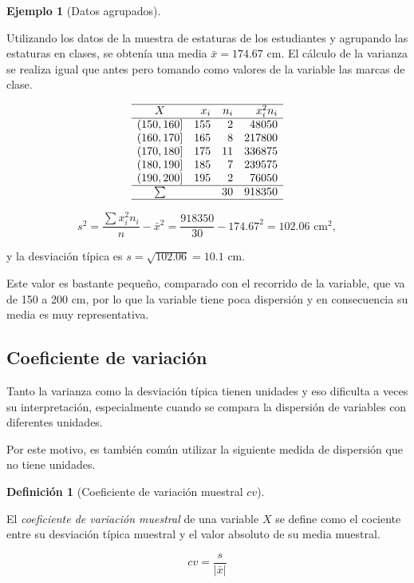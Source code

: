 \documentclass[
  spanish,
  a4paper,
]{scrreport}
\theoremstyle{plain}
\theoremstyle{definition}
\newtheorem{example}{Ejemplo}[chapter]
\theoremstyle{definition}
\newtheorem{definition}{Definición}[chapter]
\theoremstyle{remark}
\begin{document}
\begin{example}[Datos
agrupados]\protect\hypertarget{exm-desviacion-tipica-datos-agrupados}{}\label{exm-desviacion-tipica-datos-agrupados}

Utilizando los datos de la muestra de estaturas de los estudiantes y
agrupando las estaturas en clases, se obtenía una media
\(\bar x = 174.67\) cm. El cálculo de la varianza se realiza igual que
antes pero tomando como valores de la variable las marcas de clase.

\[
\begin{array}{crrr}
\hline
X & x_i & n_i & x_i^2n_i \\
\hline
(150,160] & 155 & 2 & 48050\\
(160,170] & 165 & 8 & 217800\\
(170,180] & 175 & 11 & 336875\\
(180,190] & 185 & 7 & 239575\\
(190,200] & 195 & 2 & 76050\\
\hline
\sum &  & 30 & 918350 \\
\hline
\end{array}
\]

\[s^2 = \frac{\sum x_i^2n_i}{n}-\bar x^2 = \frac{918350}{30}-174.67^2= 102.06 \mbox{ cm}^2,\]

y la desviación típica es \(s=\sqrt{102.06} = 10.1\) cm.

Este valor es bastante pequeño, comparado con el recorrido de la
variable, que va de 150 a 200 cm, por lo que la variable tiene poca
dispersión y en consecuencia su media es muy representativa.

\end{example}

\subsection{Coeficiente de variación}\label{coeficiente-de-variaciuxf3n}

Tanto la varianza como la desviación típica tienen unidades y eso
dificulta a veces su interpretación, especialmente cuando se compara la
dispersión de variables con diferentes unidades.

Por este motivo, es también común utilizar la siguiente medida de
dispersión que no tiene unidades.

\begin{definition}[Coeficiente de variación muestral
\(cv\)]\protect\hypertarget{def-coeficiente-variacion}{}\label{def-coeficiente-variacion}

El \emph{coeficiente de variación muestral} de una variable \(X\) se
define como el cociente entre su desviación típica muestral y el valor
absoluto de su media muestral.

\[cv = \frac{s}{|\bar x|}\]

\end{definition}
\end{document}
